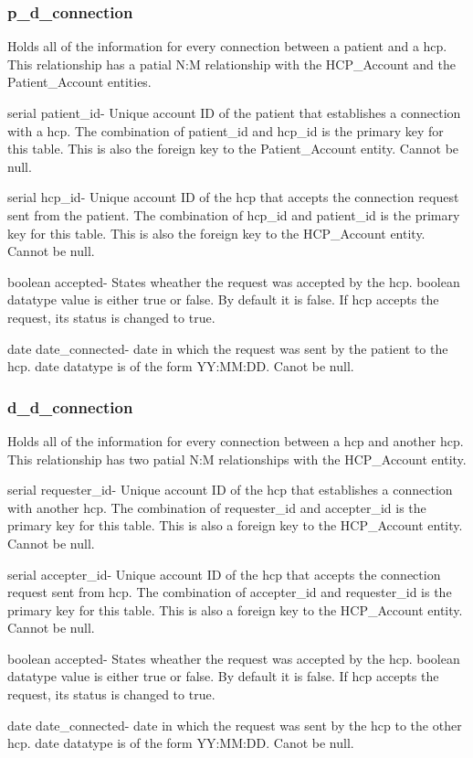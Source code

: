 \documentclass[12pt]{report}
\begin{document}
\subsubsection{p\_d\_connection}
Holds all of the information for every connection between a patient and a hcp.  This relationship has a patial N:M relationship with the HCP\_Account and the Patient\_Account entities.

\begin{description}
\item serial patient\_id- Unique account ID of the patient that establishes a connection with a hcp.  The combination of patient\_id and hcp\_id is the primary key for this table.  This is also the foreign key to the Patient\_Account entity.  Cannot be null.
\item serial hcp\_id- Unique account ID of the hcp that accepts the connection request sent from the patient.  The combination of hcp\_id and patient\_id is the primary key for this table.  This is also the foreign key to the HCP\_Account entity.  Cannot be null.
\item boolean accepted- States wheather the request was accepted by the hcp.  boolean datatype value is either true or false.  By default it is false.  If hcp accepts the request, its status is changed to true.
\item date date\_connected- date in which the request was sent by the patient to the hcp.  date datatype is of the form YY:MM:DD.  Canot be null.
\end{description}

\subsubsection{d\_d\_connection}
Holds all of the information for every connection between a hcp and another hcp.  This relationship has two patial N:M relationships with the HCP\_Account entity.

\begin{description}
\item serial requester\_id- Unique account ID of the hcp that establishes a connection with another hcp.  The combination of requester\_id and accepter\_id is the primary key for this table.  This is also a foreign key to the HCP\_Account entity.  Cannot be null.  
\item serial accepter\_id- Unique account ID of the hcp that accepts the connection request sent from hcp.  The combination of accepter\_id and requester\_id is the primary key for this table.  This is also a foreign key to the HCP\_Account entity.  Cannot be null.
\item boolean accepted- States wheather the request was accepted by the hcp.  boolean datatype value is either true or false.  By default it is false.  If hcp accepts the request, its status is changed to true.
\item date date\_connected- date in which the request was sent by the hcp to the other hcp.  date datatype is of the form YY:MM:DD.  Canot be null.
\end{description}
\end{document}
